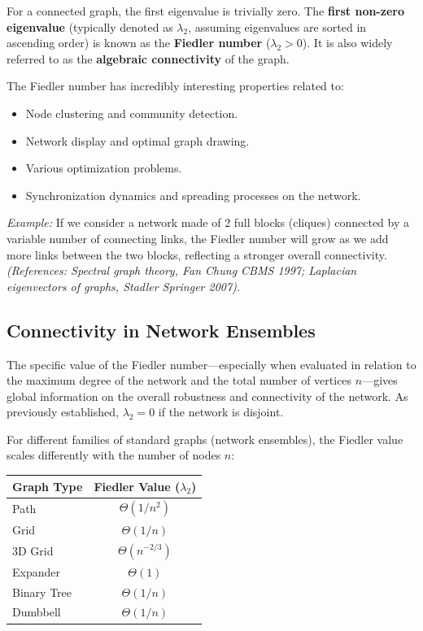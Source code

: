 For a connected graph, the first eigenvalue is trivially zero. The \textbf{first non-zero eigenvalue} (typically denoted as \( \lambda_2 \), assuming eigenvalues are sorted in ascending order) is known as the \textbf{Fiedler number} (\( \lambda_2 > 0 \)). It is also widely referred to as the \textbf{algebraic connectivity} of the graph.

The Fiedler number has incredibly interesting properties related to:
\begin{itemize}
    \item Node clustering and community detection.
    \item Network display and optimal graph drawing.
    \item Various optimization problems.
    \item Synchronization dynamics and spreading processes on the network.
\end{itemize}
\textit{Example:} If we consider a network made of 2 full blocks (cliques) connected by a variable number of connecting links, the Fiedler number will grow as we add more links between the two blocks, reflecting a stronger overall connectivity.
\textit{(References: Spectral graph theory, Fan Chung CBMS 1997; Laplacian eigenvectors of graphs, Stadler Springer 2007).}

\subsection{Connectivity in Network Ensembles}

The specific value of the Fiedler number—especially when evaluated in relation to the maximum degree of the network and the total number of vertices \( n \)—gives global information on the overall robustness and connectivity of the network. As previously established, \( \lambda_2 = 0 \) if the network is disjoint.

For different families of standard graphs (network ensembles), the Fiedler value scales differently with the number of nodes \( n \):

\begin{table}[H]
    \centering
    \begin{tabular}{lc}
        \toprule
        \textbf{Graph Type} & \textbf{Fiedler Value (\( \lambda_2 \))} \\
        \midrule
        Path                & \( \Theta(1/n^2) \)                      \\
        Grid                & \( \Theta(1/n) \)                        \\
        3D Grid             & \( \Theta(n^{-2/3}) \)                   \\
        Expander            & \( \Theta(1) \)                          \\
        Binary Tree         & \( \Theta(1/n) \)                        \\
        Dumbbell            & \( \Theta(1/n) \)                        \\
        \bottomrule
    \end{tabular}
\end{table}

